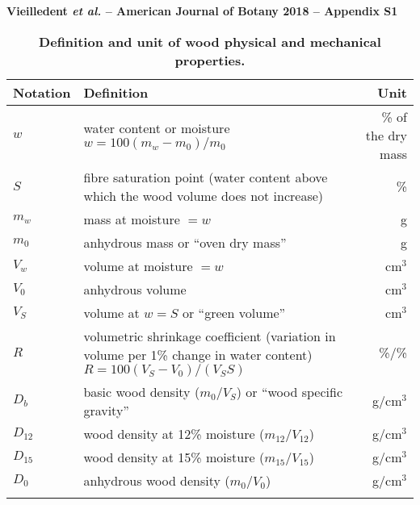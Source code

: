\documentclass[a4paper, 12pt, leqno, dvipsnames]{article}\usepackage[]{graphicx}\usepackage[]{color}
\title{}
\author{}
\date{}
\begin{document}
\thispagestyle{empty} %
\begin{center}
\textbf{Vieilledent \emph{et al.} -- American Journal of Botany 2018 -- Appendix S1}
\end{center}

\setcounter{table}{0}
\renewcommand{\tablename}{Appendix}
\renewcommand{\thetable}{S\arabic{table}}
\renewcommand{\theHtable}{Appendix.\thetable}

\vspace{1cm}

\begin{longtable}{@{}lL{8cm}r@{}}
  \caption{\textbf{Definition and unit of wood physical and mechanical properties.}}\label{sm:Definitions}\\
  \toprule
  Notation & Definition & Unit \\
  \midrule
  $w$ & water content or moisture \newline $w=100 (m_w-m_0)/m_0$ & \% of the dry mass \\
  $S$ & fibre saturation point (water content above which the wood volume does not
  increase) & \% \\
  $m_w$ & mass at moisture $=w$ & g \\
  $m_0$ & anhydrous mass or ``oven dry mass'' & g \\
  $V_w$ & volume at moisture $=w$ & cm$^3$ \\
  $V_0$ & anhydrous volume & cm$^3$ \\
  $V_S$ & volume at $w=S$ or ``green volume'' & cm$^3$ \\
  $R$ & volumetric shrinkage coefficient (variation in volume
  per 1\% change in water content) \newline $R=100 (V_S-V_0) / (V_S S)$ & \%/\% \\
  $D_b$ & basic wood density ($m_0/V_S$) or ``wood specific gravity'' & g/cm$^3$ \\
  $D_{12}$ & wood density at 12\% moisture ($m_{12}/V_{12}$) & g/cm$^3$ \\
  $D_{15}$ & wood density at 15\% moisture ($m_{15}/V_{15}$) & g/cm$^3$ \\
  $D_0$ & anhydrous wood density ($m_0/V_0$) & g/cm$^3$ \\
  \bottomrule\\
\end{longtable}
\end{document}

